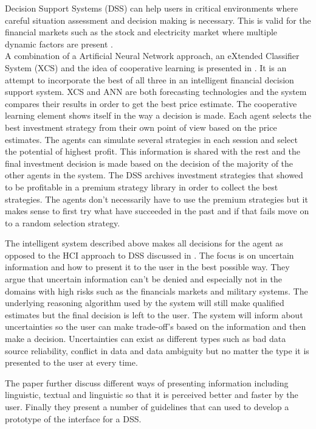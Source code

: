 Decision Support Systems (DSS) can help users in critical environments where careful situation assessment and decision making is necessary. This is valid for the financial markets such as the stock and electricity market where multiple dynamic factors are present \cite{UncertainInformation}.
\\[0.5cm]
A combination of a Artificial Neural Network approach, an eXtended Classifier System (XCS) and the idea of cooperative learning is presented in \cite{groupLearningDS}. It is an attempt to incorporate the best of all three in an intelligent financial decision support system. XCS and ANN are both forecasting technologies and the system compares their results in order to get the best price estimate. The cooperative learning element shows itself in the way a decision is made. Each agent selects the best investment strategy from their own point of view based on the price estimates. The agents can simulate several strategies in each session and select the potential of highest profit. This information is shared with the rest and the final investment decision is made based on the decision of the majority of the other agents in the system. The DSS archives investment strategies that showed to be profitable in a premium strategy library in order to collect the best strategies. The agents don't necessarily have to use the premium strategies but it makes sense to first try what have succeeded in the past and if that fails move on to a random selection strategy. 

The intelligent system described above makes all decisions for the agent as opposed to the HCI approach to DSS discussed in \cite{UncertainInformation}. The focus is on uncertain information and how to present it to the user in the best possible way. They argue that uncertain information can't be denied and especially not in the domains with high risks such as the financials markets and military systems. The underlying reasoning algorithm used by the system will still make qualified estimates but the final decision is left to the user. The system will inform about uncertainties so the user can make trade-off's based on the information and then make a decision. Uncertainties can exist as different types such as bad data source reliability, conflict in data and data ambiguity but no matter the type it is presented to the user at every time. 

The paper further discuss different ways of presenting information including linguistic, textual and linguistic so that it is perceived better and faster by the user. Finally they present a number of guidelines that can used to develop a prototype of the interface for a DSS.